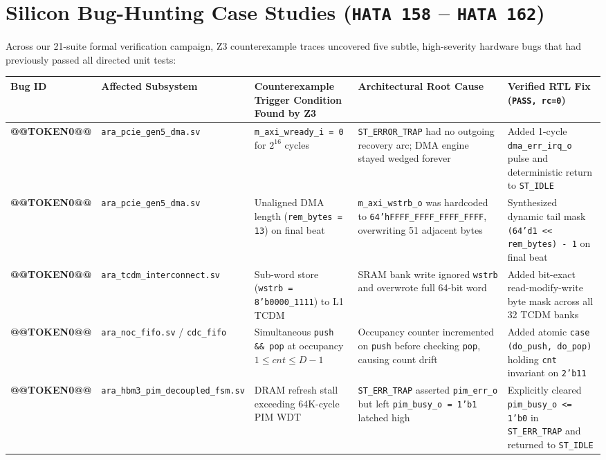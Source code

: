 \documentclass[journal,10pt,twocolumn]{IEEEtran}
\begin{document}
\section{Silicon Bug-Hunting Case Studies (\texttt{HATA 158} – \texttt{HATA 162})}

Across our 21-suite formal verification campaign, Z3 counterexample traces uncovered five subtle, high-severity hardware bugs that had previously passed all directed unit tests:

\begin{table}[htbp]
\centering\footnotesize
\begin{tabular}{p{} p{} p{} p{} p{}}
\toprule
\textbf{Bug ID} & \textbf{Affected Subsystem} & \textbf{Counterexample Trigger Condition Found by Z3} & \textbf{Architectural Root Cause} & \textbf{Verified RTL Fix (\texttt{PASS, rc=0})} \\
\midrule
\textbf{@@TOKEN0@@} & \texttt{ara\_pcie\_gen5\_dma.sv} & \texttt{m\_axi\_wready\_i = 0} for $2^{16}$ cycles & \texttt{ST\_ERROR\_TRAP} had no outgoing recovery arc; DMA engine stayed wedged forever & Added 1-cycle \texttt{dma\_err\_irq\_o} pulse and deterministic return to \texttt{ST\_IDLE} \\
\textbf{@@TOKEN0@@} & \texttt{ara\_pcie\_gen5\_dma.sv} & Unaligned DMA length (\texttt{rem\_bytes = 13}) on final beat & \texttt{m\_axi\_wstrb\_o} was hardcoded to \texttt{64'hFFFF\_FFFF\_FFFF\_FFFF}, overwriting 51 adjacent bytes & Synthesized dynamic tail mask \texttt{(64'd1 << rem\_bytes) - 1} on final beat \\
\textbf{@@TOKEN0@@} & \texttt{ara\_tcdm\_interconnect.sv} & Sub-word store (\texttt{wstrb = 8'b0000\_1111}) to L1 TCDM & SRAM bank write ignored \texttt{wstrb} and overwrote full 64-bit word & Added bit-exact read-modify-write byte mask across all 32 TCDM banks \\
\textbf{@@TOKEN0@@} & \texttt{ara\_noc\_fifo.sv} / \texttt{cdc\_fifo} & Simultaneous \texttt{push \&\& pop} at occupancy $1 \le cnt \le D-1$ & Occupancy counter incremented on \texttt{push} before checking \texttt{pop}, causing count drift & Added atomic \texttt{case ({do\_push, do\_pop})} holding \texttt{cnt} invariant on \texttt{2'b11} \\
\textbf{@@TOKEN0@@} & \texttt{ara\_hbm3\_pim\_decoupled\_fsm.sv} & DRAM refresh stall exceeding 64K-cycle PIM WDT & \texttt{ST\_ERR\_TRAP} asserted \texttt{pim\_err\_o} but left \texttt{pim\_busy\_o = 1'b1} latched high & Explicitly cleared \texttt{pim\_busy\_o <= 1'b0} in \texttt{ST\_ERR\_TRAP} and returned to \texttt{ST\_IDLE} \\
\bottomrule
\end{tabular}
\vspace{4pt}
\end{table}
\end{document}
